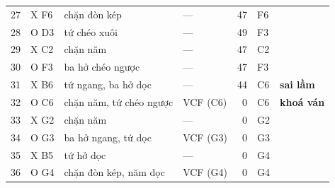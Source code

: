 {\begin{longtable}{rlp{4.4cm}lrll}
    27 & X F6 & chặn đòn kép & --- & 47 & F6 &  \\
    28 & O D3 & tứ chéo xuôi & --- & 49 & F3 &  \\
    29 & X C2 & chặn năm & --- & 47 & C2 &  \\
    30 & O F3 & ba hở chéo ngược & --- & 47 & F3 &  \\
    31 & X B6 & tứ ngang, ba hở dọc & --- & 44 & C6 & \textbf{sai lầm} \\
    32 & O C6 & chặn năm, tứ chéo ngược & VCF (C6) & 0 & C6 & \textbf{khoá ván} \\
    33 & X G2 & chặn năm & --- & 0 & G2 &  \\
    34 & O G3 & ba hở ngang, tứ dọc & VCF (G3) & 0 & G3 &  \\
    35 & X B5 & tứ hở dọc & --- & 0 & G4 &  \\
    36 & O G4 & chặn đòn kép, năm dọc & VCF (G4) & 0 & G4 &  \\
\end{longtable}
}
